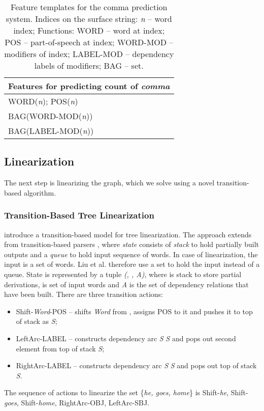 \documentclass[11pt]{article}
\begin{document}
\begin{table}\centering
\footnotesize
\begin{tabular}{|l|}

  \hline
  Features for predicting count of {\it comma} \\
\hline
	WORD({\it n}); POS({\it n})\\
	BAG(WORD-MOD({\it n}))\\
	BAG(LABEL-MOD({\it n}))\\
  \hline
  
\end{tabular}
\caption{Feature templates for the comma prediction system. Indices on the surface string: {\it n} -- word index; Functions: WORD -- word at index; POS -- part-of-speech at index; WORD-MOD -- modifiers of index; LABEL-MOD -- dependency labels of modifiers; BAG -- set. }
\label{function-word-comma}
\vspace*{-1em}
\end{table}

\subsection{Linearization}
\label{linearization}
The next step is linearizing the graph, which we solve using a novel transition-based algorithm.
\subsubsection{Transition-Based Tree Linearization} 
\label{transition-based-linearization}
 introduce a transition-based model for tree linearization. The approach extends from transition-based parsers \cite{nivre2004deterministic,chen2014fast}, where {\it state} consists of {\it stack} to hold partially built outputs and a {\it queue} to hold input sequence of words. In case of linearization, the input is a set of words. Liu et al. therefore use a set to hold the input instead of a queue. State is represented by a tuple {\it (, , A)}, where  is stack to store partial derivations,  is set of input words and {\it A} is the set of dependency relations that have been built. There are three transition actions:	
\begin{itemize}[noitemsep,nolistsep]
\item {\sc Shift}-{\it Word}-POS -- shifts {\it Word} from , assigns POS to it and pushes it to top of stack as {\it S};
\item {\sc LeftArc}-LABEL -- constructs dependency arc {\it S} {\it S} and pops out second element from top of stack {\it S};
\item {\sc RightArc}-LABEL -- constructs dependency arc {\it S} {\it S} and pops out top of stack {\it S}.
\end{itemize} 
The sequence of actions to linearize the set \{{\it he, goes, home}\} is {\sc Shift}-{\it he}, {\sc Shift}-{\it goes}, {\sc Shift}-{\it home}, {\sc RightArc}-OBJ, {\sc LeftArc}-SBJ.
\end{document}
